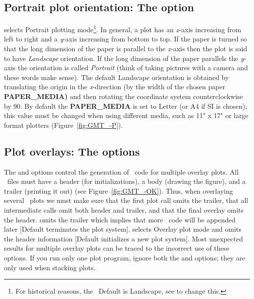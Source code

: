 \subsection{Portrait plot orientation: The  option} 


 selects Portrait plotting mode\footnote{For historical reasons, the \GMT\
Default is Landscape, see  to change this.}.  In general,
a plot has an \emph{x}-axis increasing from left to
right and a \emph{y}-axis increasing from bottom to top.  If the
paper is turned so that the long dimension of the paper is
parallel to the \emph{x}-axis then the plot is said to have
\emph{Landscape} orientation.  If the long dimension of
the paper parallels the \emph{y}-axis the orientation is called
\emph{Portrait} (think of taking pictures with a camera
and these words make sense).  The
default Landscape orientation is obtained by translating the origin in the
\emph{x}-direction (by the width of the chosen paper \textbf{PAPER\_MEDIA)} and then rotating the
coordinate system counterclockwise by 90\DS.  By default the \textbf{PAPER\_MEDIA} is
set to Letter (or A4 if SI is chosen); this value must be changed
when using different media, such as 11" x 17" or large format plotters
(Figure~\ref{fig:GMT_-P}).


\subsection{Plot overlays: The   options}


The  and  options control the generation of \PS\ code for multiple
overlay plots.  All \PS\ files must have a header (for initializations),
a body (drawing the figure), and a trailer (printing it out) (see
Figure~\ref{fig:GMT_-OK}).  Thus,
when overlaying several \GMT\ plots we must make sure that the first plot
call omits the trailer, that all intermediate calls omit both header and
trailer, and that the final overlay omits the header.
 omits the trailer which implies that more \PS\ code will be appended
later [Default terminates the plot system].  \Opt{O} selects Overlay plot
mode and omits the header information [Default initializes a new plot system].
Most unexpected results for multiple overlay plots can be traced to the
incorrect use of these options.  If you run only one plot
program, ignore both the  and  options; they are
only used when stacking plots. 

